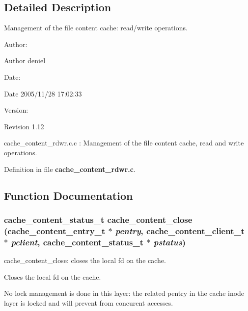 \subsection{Detailed Description}
Management of the file content cache: read/write operations. 

\begin{Desc}
\item[Author:]\begin{Desc}
\item[Author]deniel \end{Desc}
\end{Desc}
\begin{Desc}
\item[Date:]\begin{Desc}
\item[Date]2005/11/28 17:02:33 \end{Desc}
\end{Desc}
\begin{Desc}
\item[Version:]\begin{Desc}
\item[Revision]1.12 \end{Desc}
\end{Desc}
cache\_\-content\_\-rdwr.c.c : Management of the file content cache, read and write operations.

Definition in file {\bf cache\_\-content\_\-rdwr.c}.

\subsection{Function Documentation}
\subsubsection{\setlength{\rightskip}{0pt plus 5cm}cache\_\-content\_\-status\_\-t cache\_\-content\_\-close (cache\_\-content\_\-entry\_\-t $\ast$ {\em pentry}, cache\_\-content\_\-client\_\-t $\ast$ {\em pclient}, cache\_\-content\_\-status\_\-t $\ast$ {\em pstatus})}\label{cache__content__rdwr_8c_a3}


cache\_\-content\_\-close: closes the local fd on the cache.

Closes the local fd on the cache.

No lock management is done in this layer: the related pentry in the cache inode layer is locked and will prevent from concurent accesses.

